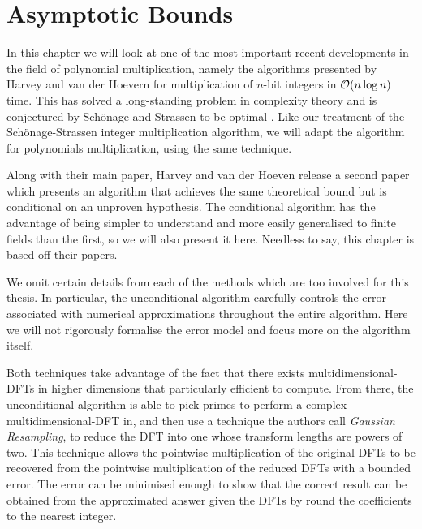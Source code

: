 \chapter{Asymptotic Bounds}\label{chp:asymptotic}

In this chapter we will look at one of the most important recent developments in the field of polynomial multiplication, namely the algorithms presented by Harvey and van der Hoevern \cite{nlogn} for multiplication of $n$-bit integers in $\mathcal O(n \log n)$ time. This has solved a long-standing problem in complexity theory and is conjectured by Sch\"{o}nage and Strassen to be optimal \cite{sch-str-optimality-int-mult}. Like our treatment of the Sch\"{o}nage-Strassen integer multiplication algorithm, we will adapt the algorithm for polynomials multiplication, using the same technique.

\medskip

Along with their main paper, Harvey and van der Hoeven release a second paper \cite{ffnlogn} which presents an algorithm that achieves the same theoretical bound but is conditional on an unproven hypothesis. The conditional algorithm has the advantage of being simpler to understand and more easily generalised to finite fields than the first, so we will also present it here.
Needless to say, this chapter is based off their papers.


\medskip

We omit certain details from each of the methods which are too involved for this thesis. In particular, the unconditional algorithm carefully controls the error associated with numerical approximations throughout the entire algorithm. Here we will not rigorously formalise the error model and focus more on the algorithm itself.

\medskip


Both techniques take advantage of the fact that there exists multidimensional-DFTs in higher dimensions that particularly efficient to compute. From there, the unconditional algorithm is able to pick primes to perform a complex multidimensional-DFT in, and then use a technique the authors call \emph{Gaussian Resampling}, to reduce the DFT into one whose transform lengths are powers of two. This technique allows the pointwise multiplication of the original DFTs to be recovered from the pointwise multiplication of the reduced DFTs with a bounded error. The error can be minimised enough to show that the correct result can be obtained from the approximated answer given the DFTs by round the coefficients to the nearest integer. 


